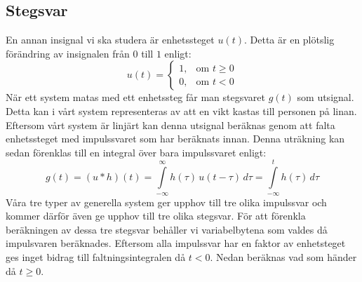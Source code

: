 \subsection{Stegsvar}
En annan insignal vi ska studera är enhetssteget $u(t)$. Detta är en plötslig förändring av insignalen från $0$ till $1$ enligt:
$$u(t)=\begin{cases} 1, & \text{om } t \ge 0 \\ 0, & \text{om } t < 0\end{cases}$$
När ett system matas med ett enhetssteg får man stegsvaret $g(t)$ som utsignal. Detta kan i vårt system representeras av att en vikt kastas till personen på linan. Eftersom vårt system är linjärt kan denna utsignal beräknas genom att falta enhetssteget med impulssvaret som har beräknats innan. Denna uträkning kan sedan förenklas till en integral över bara impulssvaret enligt:
$$g(t)=(u*h)(t)=\int\limits_{-\infty}^{\infty}h(\tau)\,u(t-\tau)\,d\tau=\int\limits_{-\infty}^{t}h(\tau)\,d\tau$$
Våra tre typer av generella system ger upphov till tre olika impulssvar och kommer därför även ge upphov till tre olika stegsvar. För att förenkla beräkningen av dessa tre stegsvar behåller vi variabelbytena som valdes då impulsvaren beräknades. Eftersom alla impulssvar har en faktor av enhetsteget ges inget bidrag till faltningsintegralen då $t < 0$. Nedan beräknas vad som händer då $t \ge 0$.
